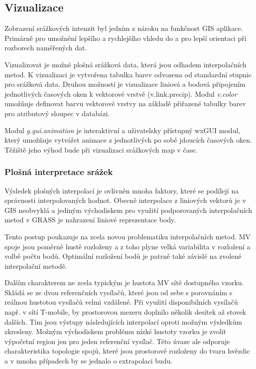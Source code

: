 \documentclass[a4paper,12pt,oneside]{report}
\begin{document}
\subsection{Vizualizace}
Zobrazení srážkových intenzit byl jedním z nároku na funkčnost GIS aplikace. Primárně pro umožnění lepšího a rychlejšího vhledu do a pro lepší orientaci při rozborech naměřených dat.

Vizualizovat je možné plošná srážková data, která jsou odhadem interpolačních metod. K vizualizaci je vytvořena tabulka barev odvozena od standardní  stupnic pro srážková data. Druhou možností je vizualizace liniová a bodová připojením jednotlivých časových oken k vektorové vrstvě (v.link.precip). Modul \textit{v.color} umožňuje definovat barvu vektorové vrstvy na základě přiřazené tabulky barev pro atributový sloupec v databázi.

Modul \textit{g.gui.animation} je interaktivní a uživatelsky přístupný wxGUI modul, který umožňuje vytvářet animace z jednotlivých po sobě jdoucích časových oken. Těžiště jeho výhod bude při vizualizaci srážkových map v čase. 

\subsubsection{Plošná interpretace srážek}
Výsledek plošných interpolací  je ovlivněn mnoha faktory, které se podílejí na správnosti interpolovaných  hodnot. Obecně interpolace z liniových vektorů je v GIS neobvyklá a jediným východiskem pro využití podporovaných interpolačních metod v GRASS je nahrazení liniové reprezentace body. 

Tento postup poukazuje na zcela novou problematiku interpolačních metod. MV spoje jsou poměrně hustě rozloženy a z toho plyne  velká variabilita v rozložení a volbě počtu bodů. Optimální rozložení bodů je patrně také závislé na zvolené interpolační metodě.

Dalším charakterem ne zcela typickým je hustota MV sítě dostupného vzorku. Skládá se ze dvou referenčních vysílačů, které jsou od sebe s porovnáním s reálnou  hustotou vysílačů velmi vzdálené. Při využití disponibilních vysílačů např. v sítí T-mobile, by prostorovou mezeru doplnilo několik desítek až stovek dalších. Tím jsou výstupy následujících interpolací oproti možným výsledkům zkresleny. Možným východiskem  problému nízké hustoty vzorku je zvolit výpočetní region jen pro jeden referenční vysílač. Této úvaze ale odporuje charakteristika topologie spojů, které jsou prostorově rozloženy do tvaru hvězdic a v mnoha případech by se jednalo o extrapolaci budu.
\end{document}
